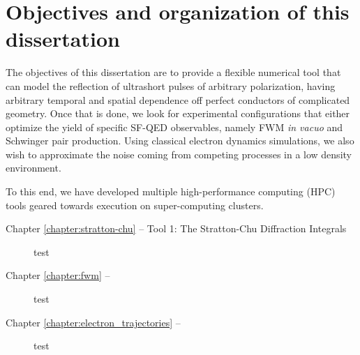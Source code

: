 \documentclass[11pt,SymmetricalJury]{inrsthesis/inrsthesis}
\begin{document}
\section{Objectives and organization of this dissertation}
\label{sec:intro.objectives}

The objectives of this dissertation are to provide a flexible numerical tool that
can model the reflection of ultrashort pulses of arbitrary polarization, having
arbitrary temporal and spatial dependence off perfect conductors of complicated
geometry. Once that is done, we look for experimental configurations that either
optimize the yield of specific SF-QED observables, namely FWM \textit{in vacuo}
and Schwinger pair production. Using classical electron dynamics simulations, we
also wish to approximate the noise coming from competing processes in a low
density environment.

To this end, we have developed multiple high-performance computing (HPC) tools
geared towards execution on super-computing clusters.

\begin{description}
  \item [Chapter \ref{chapter:stratton-chu} -- Tool 1: The Stratton-Chu Diffraction Integrals]
  test
  \item [Chapter \ref{chapter:fwm} -- ]
  test
  \item [Chapter \ref{chapter:electron_trajectories} -- ]
  test
\end{description}


\end{document}
